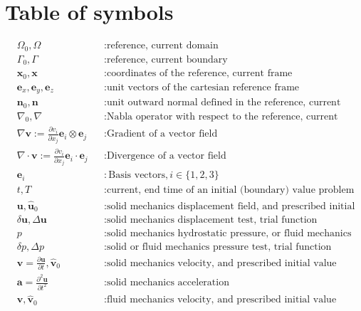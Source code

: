 \documentclass[a4paper,12pt]{report}
\newcommand{\Om}{\mathit{\Omega}}
\newcommand{\Gm}{\mathit{\Gamma}}
\begin{document}
\section{Table of symbols}
\begin{equation}
\nonumber
\begin{aligned}
&\Om_0,\Om &&: \text{reference, current domain} \\
&\Gm_0,\Gm &&: \text{reference, current boundary} \\
&\boldsymbol{x}_0, \boldsymbol{x} &&: \text{coordinates of the reference, current frame} \\
&\boldsymbol{e}_x, \boldsymbol{e}_y, \boldsymbol{e}_z &&: \text{unit vectors of the cartesian reference frame} \\
&\boldsymbol{n}_0, \boldsymbol{n} &&: \text{unit outward normal defined in the reference, current frame} \\
&\nabla_{0},\nabla &&: \text{Nabla operator with respect to the reference, current frame} \\
&\nabla\boldsymbol{v} := \frac{\partial v_i}{\partial x_j} \boldsymbol{e}_{i} \otimes\boldsymbol{e}_{j} &&: \text{Gradient of a vector field} \\
&\nabla\cdot\boldsymbol{v} := \frac{\partial v_i}{\partial x_j} \boldsymbol{e}_{i} \cdot\boldsymbol{e}_{j} &&: \text{Divergence of a vector field} \\
&\boldsymbol{e}_{i} &&: \text{Basis vectors}, i\in \{1,2,3\} \\
&t, T &&: \text{current, end time of an initial (boundary) value problem} \\
&\boldsymbol{u}, \hat{\boldsymbol{u}}_{0} &&: \text{solid mechanics displacement field, and prescribed initial value} \\
&\delta\boldsymbol{u}, \Delta\boldsymbol{u} &&: \text{solid mechanics displacement test, trial function} \\
& p &&: \text{solid mechanics hydrostatic pressure, or fluid mechanics pressure} \\
& \delta p, \Delta p &&: \text{solid or fluid mechanics pressure test, trial function} \\
&\boldsymbol{v}=\frac{\partial\boldsymbol{u}}{\partial t}, \hat{\boldsymbol{v}}_{0} &&: \text{solid mechanics velocity, and prescribed initial value} \\
&\boldsymbol{a}=\frac{\partial^2\boldsymbol{u}}{\partial t^2} &&: \text{solid mechanics acceleration} \\
&\boldsymbol{v}, \hat{\boldsymbol{v}}_{0} &&: \text{fluid mechanics velocity, and prescribed initial value} \\

\end{aligned}
\end{equation}
\end{document}
